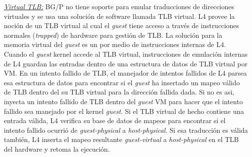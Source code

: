 \underline{\emph{Virtual TLB:}} BG/P no tiene soporte para emular traducciones de direcciones virtuales y se usa una solución de software llamada TLB virtual. L4 provee la noción de un TLB virtual al cual el \emph{guest} tiene acceso a través de instrucciones normales (\emph{trapped}) de hardware para gestión de TLB. La solución para la memoria virtual del \emph{guest} es un por medio de instrucciones internas de L4. Cuando el \emph{guest} kernel accede al TLB virtual, instrucciones de emulación internas de L4 guardan las entradas dentro de una estructura de datos de TLB virtual por VM. En un intento fallido de TLB, el manejador de intentos fallidos de L4 parsea esa estructura de datos para encontrar si el \emph{guest} ha insertado un mapeo válido de TLB dentro del su TLB virtual para la dirección fallida dada. Si no es asi, inyecta un intento fallido de TLB dentro del \emph{guest} VM para hacer que el intento fallido sea manejado por el kernel \emph{guest}. Si el TLB virtual de hecho contiene una entrada válida, L4 verifica su base de datos de mapeos para encontrar si el intento fallido ocurrió de \emph{guest-physical} a \emph{host-physical}. Si esa traducción es válida también, L4 inserta el mapeo resultante \emph{guest-virtual} a \emph{host-physical} en el TLB del hardware y retoma la ejecución. 

